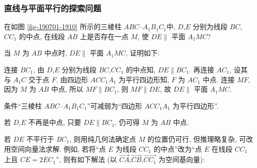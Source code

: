 \subsubsection{直线与平面平行的探索问题}
\begin{example}
    在如图 \ref{fig-190701-1910} 所示的三棱柱 $ABC\text{--}A_1B_1C_1$中, $D$,$E$ 分别为线段 $BC$,$CC_1$ 的中点, 在线段 $AB$ 上是否存在一点 $M$, 使 $DE\parallel$ 平面 $A_1 MC$?
\end{example}
\beginsolution
    当 $M$ 为 $AB$ 中点时, $DE\parallel$ 平面 $A_1 MC$, 
    证明如下:

    连接 $BC_1$, 由 $D$,$E$ 分别为线段 $BC$,$CC_1$ 的中点知, $DE\parallel BC_1$. 再连接 $AC_1$, 设其与 $A_1C$ 交于点 $F$. 由四边形 $ACC_1 A_1$ 为平行四边形知, $F$ 为 $AC_1$ 中点. 连接 $MF$, 因为 $M$ 为 $AB$ 中点,
    所以 $MF\parallel BC_1$, 则 $MF\parallel DE$, 故 $DE\parallel$ 平面 $A_1 MC$.

    \varexercise 条件“三棱柱 $ABC\text{--}A_1B_1C_1$”可减弱为“四边形 $ACC_1 A_1$ 为平行四边形”.

    \varexercise 若 $D$,$E$ 不再是中点, 只要 $DE\parallel BC_1$, 仍可得 $M$ 为 $AB$ 中点.

    \varexercise 若 $DE$ 不平行于 $BC_1$, 则用纯几何法确定点 $M$ 的位置仍可行, 但推理略复杂, 可改用空间向量法求解. 
    例如, 若将“点 $E$ 为线段 $CC_1$ 的中点”改为“点 $E$ 在线段 $CC_1$ 上且 $CE= 2EC_1$”, 则有如下解法 (以 $\overrightarrow{CA}$,$\overrightarrow{CB}$,$\overrightarrow{CC_1}$ 为空间基向量):


